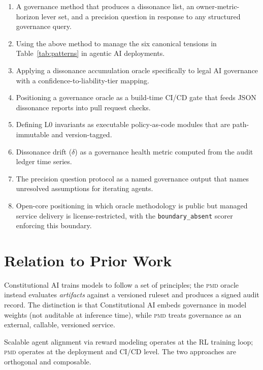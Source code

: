 \documentclass[11pt,letterpaper]{article}
\theoremstyle{remark}
\newcommand{\pmd}{\textsc{pmd}}
\begin{document}
\begin{enumerate}[leftmargin=1.5em]
  \item A governance method that produces a dissonance list, an
        owner-metric-horizon lever set, and a precision question
        in response to any structured governance query.
  \item Using the above method to manage the six canonical tensions
        in Table~\ref{tab:patterns} in agentic AI deployments.
  \item Applying a dissonance accumulation oracle specifically to
        legal AI governance with a confidence-to-liability-tier
        mapping.
  \item Positioning a governance oracle as a build-time CI/CD gate
        that feeds JSON dissonance reports into pull request checks.
  \item Defining L0 invariants as executable policy-as-code modules
        that are path-immutable and version-tagged.
  \item Dissonance drift ($\delta$) as a governance health metric
        computed from the audit ledger time series.
  \item The precision question protocol as a named governance
        output that names unresolved assumptions for iterating agents.
  \item Open-core positioning in which oracle methodology is public
        but managed service delivery is license-restricted, with the
        \texttt{boundary\_absent} scorer enforcing this boundary.
\end{enumerate}

\section{Relation to Prior Work}
\label{sec:related}

Constitutional AI \cite{bai2022constitutional} trains models to follow
a set of principles; the \pmd{} oracle instead evaluates \emph{artifacts}
against a versioned ruleset and produces a signed audit record.  The
distinction is that Constitutional AI embeds governance in model weights
(not auditable at inference time), while \pmd{} treats governance as an
external, callable, versioned service.

Scalable agent alignment via reward modeling \cite{leike2018scalable}
operates at the RL training loop; \pmd{} operates at the deployment and
CI/CD level.  The two approaches are orthogonal and composable.
\end{document}
